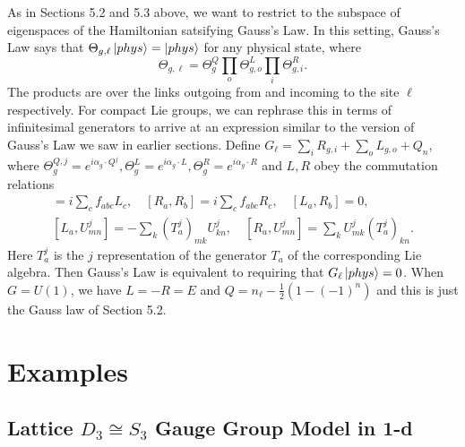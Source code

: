 \documentclass[11pt,reqno]{amsart}
\numberwithin{equation}{section}
\begin{document}
	As in Sections 5.2 and 5.3 above, we want to restrict to the subspace of eigenspaces of the Hamiltonian satsifying Gauss's Law.
	In this setting, Gauss's Law says that $\Theta_{g,\ell} \ket{phys} = \ket{phys}$ for any physical state, where
	\begin{equation}
		\Theta_{g,\ell}=\Theta^Q_g\prod_{o} \Theta^L_{g,o} \prod_{i}\Theta^R_{g,i}.
	\end{equation}
	The products are over the links outgoing from and incoming to the site $\ell$ respectively.
	For compact Lie groups, we can rephrase this in terms of infinitesimal generators to arrive at an expression similar to the version of Gauss's Law we saw in earlier sections.
	Define $G_\ell = \sum_{i}R_{g,i}+\sum_{o} L_{g,o} + Q_n$, where
	$\Theta_g^{Q,j}=e^{i\alpha_g \cdot Q^j}, \Theta^L_{g}=e^{i\alpha_g \cdot L}, \Theta^R_g=e^{i\alpha_g \cdot R}$ and $L,R$ obey the commutation relations 
	\begin{align}
		[L_a,L_b]=i\sum_{c}f_{abc}L_c, \quad [R_a,R_b]=i\sum_{c}f_{abc}R_c, \quad [L_a,R_b]=0, \\
		[L_a,U^j_{mn}]=-\sum_{k}(T^j_a)_{mk} U^j_{kn}, \quad [R_a,U^j_{mn}]=\sum_{k}U^j_{mk}(T^j_a)_{kn} . 
	\end{align}
	Here $T^j_a$ is the $j$ representation of the generator $T_a$ of the corresponding Lie algebra.
	Then Gauss's Law is equivalent to requiring that $G_\ell \ket{phys}=0$.
	When $G=U(1)$, we have $L=-R=E$ and $Q=n_\ell - \frac{1}{2}(1-(-1)^n)$ and this is just the Gauss law of Section 5.2.
	
	
	\section{Examples}
	
	\subsection{Lattice $D_3\cong S_3$ Gauge Group Model in 1-d}	
	
\end{document}
